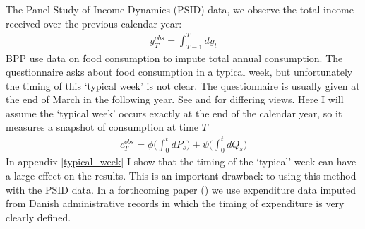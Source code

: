 \documentclass[AER]{AEA}
\begin{document}
The Panel Study of Income Dynamics (PSID) data, we observe the total income received over the previous calendar year:
\begin{align*}
y^{obs}_T = \int_{T-1}^{T} dy_t
\end{align*}
BPP use data on food consumption to impute total annual consumption. The questionnaire asks about food consumption in a typical week, but unfortunately the timing of this `typical week' is not clear. The questionnaire is usually given at the end of March in the following year. See \cite{altonji_testing_1987} and \cite{hall_sensitivity_1982} for differing views. Here I will assume the `typical week' occurs exactly at the end of the calendar year, so it measures a snapshot of consumption at time $T$
\begin{align*}
c^{obs}_T = \phi \Big( \int_{0}^{t} dP_s  \Big)  +\psi\Big( \int_{0}^{t}dQ_s\Big)
\end{align*}
In appendix \ref{typical_week} I show that the timing of the `typical' week can have a large effect on the results. This is an important drawback to using this method with the PSID data. In a forthcoming paper (\cite{crawley_consumption_2018}) we use expenditure data imputed from Danish administrative records in which the timing of expenditure is very clearly defined.
\end{document}
